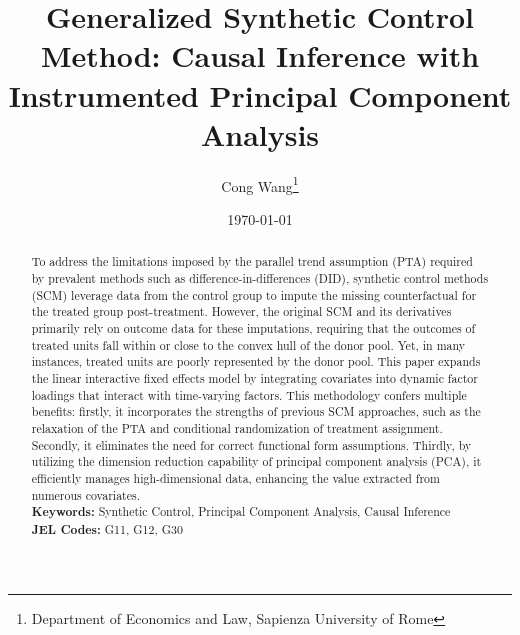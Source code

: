 \documentclass[12pt]{article}
\begin{document}
\newtheorem{assumption}{Assumption}

\begin{titlepage}
\title{Generalized Synthetic Control Method: Causal Inference with Instrumented Principal Component Analysis}
\author{ Cong Wang\thanks{Department of Economics and Law, Sapienza University of Rome}}
\date{\today}
\maketitle
\begin{abstract}
\noindent To address the limitations imposed by the parallel trend assumption (PTA) required by prevalent methods such as difference-in-differences (DID), synthetic control methods (SCM) leverage data from the control group to impute the missing counterfactual for the treated group post-treatment. However, the original SCM and its derivatives primarily rely on outcome data for these imputations, requiring that the outcomes of treated units fall within or close to the convex hull of the donor pool. Yet, in many instances, treated units are poorly represented by the donor pool. This paper expands the linear interactive fixed effects model by integrating covariates into dynamic factor loadings that interact with time-varying factors. This methodology confers multiple benefits: firstly, it incorporates the strengths of previous SCM approaches, such as the relaxation of the PTA and conditional randomization of treatment assignment. Secondly, it eliminates the need for correct functional form assumptions. Thirdly, by utilizing the dimension reduction capability of principal component analysis (PCA), it efficiently manages high-dimensional data, enhancing the value extracted from numerous covariates. \\

\noindent\textbf{Keywords:} Synthetic Control, Principal Component Analysis, Causal Inference\\

\noindent\textbf{JEL Codes:} G11, G12, G30\\
\bigskip
\end{abstract}
\setcounter{page}{0}
\thispagestyle{empty}
\end{titlepage}
\pagebreak \newpage

\doublespacing

\end{document}
